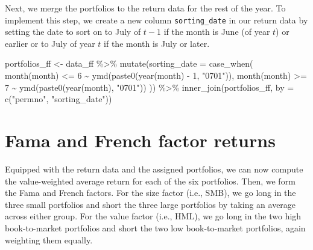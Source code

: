 \documentclass[
]{krantz}
\newenvironment{Shaded}{\begin{snugshade}}{\end{snugshade}}
\newcommand{\AttributeTok}[1]{\textcolor[rgb]{0.61,0.61,0.61}{#1}}
\newcommand{\DecValTok}[1]{\textcolor[rgb]{0.06,0.06,0.06}{#1}}
\newcommand{\FunctionTok}[1]{\textcolor[rgb]{0,0,0}{#1}}
\newcommand{\NormalTok}[1]{#1}
\newcommand{\OtherTok}[1]{\textcolor[rgb]{0.37,0.37,0.37}{#1}}
\newcommand{\SpecialCharTok}[1]{\textcolor[rgb]{0,0,0}{#1}}
\newcommand{\StringTok}[1]{\textcolor[rgb]{0.5,0.5,0.5}{#1}}
\begin{document}
Next, we merge the portfolios to the return data for the rest of the year. To implement this step, we create a new column \texttt{sorting\_date} in our return data by setting the date to sort on to July of \(t-1\) if the month is June (of year \(t\)) or earlier or to July of year \(t\) if the month is July or later.

\begin{Shaded}
\begin{Highlighting}[]
\NormalTok{portfolios\_ff }\OtherTok{\textless{}{-}}\NormalTok{ data\_ff }\SpecialCharTok{\%\textgreater{}\%}
  \FunctionTok{mutate}\NormalTok{(}\AttributeTok{sorting\_date =} \FunctionTok{case\_when}\NormalTok{(}
    \FunctionTok{month}\NormalTok{(month) }\SpecialCharTok{\textless{}=} \DecValTok{6} \SpecialCharTok{\textasciitilde{}} \FunctionTok{ymd}\NormalTok{(}\FunctionTok{paste0}\NormalTok{(}\FunctionTok{year}\NormalTok{(month) }\SpecialCharTok{{-}} \DecValTok{1}\NormalTok{, }\StringTok{"0701"}\NormalTok{)),}
    \FunctionTok{month}\NormalTok{(month) }\SpecialCharTok{\textgreater{}=} \DecValTok{7} \SpecialCharTok{\textasciitilde{}} \FunctionTok{ymd}\NormalTok{(}\FunctionTok{paste0}\NormalTok{(}\FunctionTok{year}\NormalTok{(month), }\StringTok{"0701"}\NormalTok{))}
\NormalTok{  )) }\SpecialCharTok{\%\textgreater{}\%}
  \FunctionTok{inner\_join}\NormalTok{(portfolios\_ff, }\AttributeTok{by =} \FunctionTok{c}\NormalTok{(}\StringTok{"permno"}\NormalTok{, }\StringTok{"sorting\_date"}\NormalTok{))}
\end{Highlighting}
\end{Shaded}

\hypertarget{fama-and-french-factor-returns}{%
\section{Fama and French factor returns}\label{fama-and-french-factor-returns}}

Equipped with the return data and the assigned portfolios, we can now compute the value-weighted average return for each of the six portfolios. Then, we form the Fama and French factors. For the size factor (i.e., SMB), we go long in the three small portfolios and short the three large portfolios by taking an average across either group. For the value factor (i.e., HML), we go long in the two high book-to-market portfolios and short the two low book-to-market portfolios, again weighting them equally.
\end{document}
